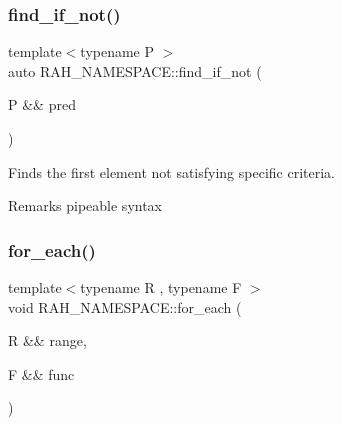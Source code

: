 \subsubsection{\texorpdfstring{find\_if\_not()}{find\_if\_not()}\hspace{0.1cm}{\footnotesize\ttfamily [2/2]}}
{\footnotesize\ttfamily template$<$typename P $>$ \\
auto R\+A\+H\+\_\+\+N\+A\+M\+E\+S\+P\+A\+C\+E\+::find\+\_\+if\+\_\+not (\begin{DoxyParamCaption}\item[{P \&\&}]{pred }\end{DoxyParamCaption})}



Finds the first element not satisfying specific criteria. 

\begin{DoxyRemark}{Remarks}
pipeable syntax
\end{DoxyRemark}

\begin{DoxyCodeInclude}{0}
\DoxyCodeLine{        );}
\end{DoxyCodeInclude}
\mbox{\label{namespace_r_a_h___n_a_m_e_s_p_a_c_e_a81222de7a8a2ef5d8dfb40733190a573}} 
\subsubsection{\texorpdfstring{for\_each()}{for\_each()}\hspace{0.1cm}{\footnotesize\ttfamily [1/2]}}
{\footnotesize\ttfamily template$<$typename R , typename F $>$ \\
void R\+A\+H\+\_\+\+N\+A\+M\+E\+S\+P\+A\+C\+E\+::for\+\_\+each (\begin{DoxyParamCaption}\item[{R \&\&}]{range,  }\item[{F \&\&}]{func }\end{DoxyParamCaption})}



